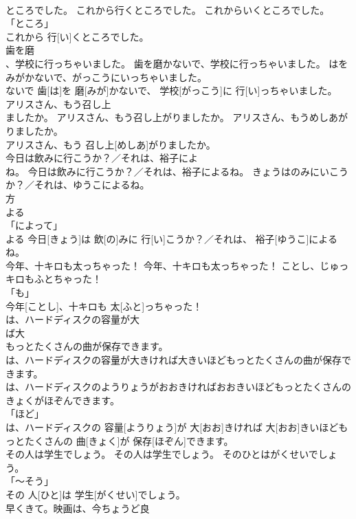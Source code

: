 \documentclass[8pt]{extreport}
\begin{document}
\begin{CJK}{UTF8}{min}
\\	ところでした。	これから行くところでした。	これからいくところでした。	
\\	「ところ」 
\\	これから 行[い]くところでした。		
\\	歯を磨
\\	、学校に行っちゃいました。	歯を磨かないで、学校に行っちゃいました。	はをみがかないで、がっこうにいっちゃいました。	
\\	ないで	歯[は]を 磨[みが]かないで、 学校[がっこう]に 行[い]っちゃいました。		
\\	アリスさん、もう召し上
\\	ましたか。	アリスさん、もう召し上がりましたか。	アリスさん、もうめしあがりましたか。	
\\	アリスさん、もう 召し上[めしあ]がりましたか。		
\\	今日は飲みに行こうか？／それは、裕子によ
\\	ね。	今日は飲みに行こうか？／それは、裕子によるね。	きょうはのみにいこうか？／それは、ゆうこによるね。	
\\	方 
\\	よる 
\\	「によって」 
\\	よる	今日[きょう]は 飲[の]みに 行[い]こうか？／それは、 裕子[ゆうこ]によるね。		
\\	今年、十キロも太っちゃった！	今年、十キロも太っちゃった！	ことし、じゅっキロもふとちゃった！	
\\	「も」 
\\	今年[ことし]、十キロも 太[ふと]っちゃった！		
\\	は、ハードディスクの容量が大
\\	ば大
\\	もっとたくさんの曲が保存できます。	
\\	は、ハードディスクの容量が大きければ大きいほどもっとたくさんの曲が保存できます。	
\\	は、ハードディスクのようりょうがおおきければおおきいほどもっとたくさんのきょくがほぞんできます。	
\\	「ほど」 
\\	は、ハードディスクの 容量[ようりょう]が 大[おお]きければ 大[おお]きいほどもっとたくさんの 曲[きょく]が 保存[ほぞん]できます。		
\\	その人は学生でしょう。	その人は学生でしょう。	そのひとはがくせいでしょう。	
\\	「～そう」 
\\	その 人[ひと]は 学生[がくせい]でしょう。		
\\	早くきて。映画は、今ちょうど良

\end{CJK}
\end{document}
